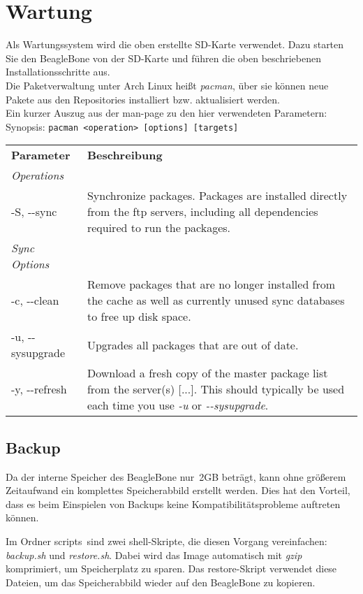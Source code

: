\section{Wartung}
Als Wartungssystem wird die oben erstellte SD-Karte verwendet. Dazu starten Sie den BeagleBone von der SD-Karte und führen die oben beschriebenen Installationsschritte aus.\\

Die Paketverwaltung unter Arch Linux heißt \emph{pacman}, über sie können neue Pakete aus den Repositories installiert bzw. aktualisiert werden.\\
Ein kurzer Auszug aus der man-page zu den hier verwendeten Parametern:\\

Synopsis: \texttt{pacman <operation> [options] [targets]}\\

\begin{longtabu} to \textwidth {X[1] X[4]}

\textbf{Parameter} & \textbf{Beschreibung}\\
\textit{Operations}\\
-S, -\--sync & Synchronize packages. Packages are installed directly from the ftp servers, including all dependencies required to run the packages.\\

\textit{Sync Options}\\
-c, -\--clean & Remove packages that are no longer installed from the cache as well as currently unused sync databases to free up disk space.\\
-u, -\--sysupgrade & Upgrades all packages that are out of date.\\
-y, -\--refresh & Download a fresh copy of the master package list from the server(s) [...]. This should typically be used each time you use \textit{-u} or \textit{-\--sysupgrade}.\\
\end{longtabu}


\subsection{Backup}
Da der interne Speicher des BeagleBone \glqq nur\grqq ~2GB beträgt, kann ohne größerem Zeitaufwand ein komplettes Speicherabbild erstellt werden. Dies hat den Vorteil, dass es beim Einspielen von Backups keine Kompatibilitätsprobleme auftreten können.

Im Ordner \glqq scripts\grqq ~sind zwei shell-Skripte, die diesen Vorgang vereinfachen: \textit{backup.sh} und \textit{restore.sh}. Dabei wird das Image automatisch mit \emph{gzip} komprimiert, um Speicherplatz zu sparen. Das restore-Skript verwendet diese Dateien, um das Speicherabbild wieder auf den BeagleBone zu kopieren.\\

